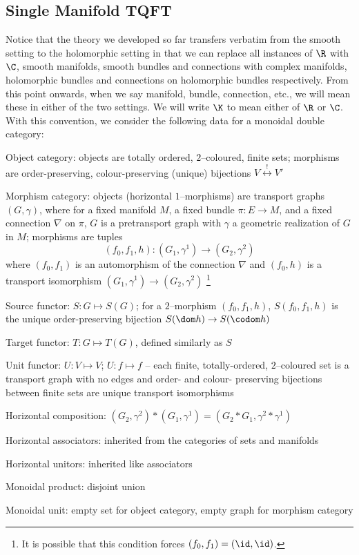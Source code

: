 
\subsection{Single Manifold TQFT}\label{subsec:sing_man_tqft}

Notice that the theory we developed so far transfers verbatim from the smooth
setting to the holomorphic setting in that we can replace all instances of $\R$
with $\C$, smooth manifolds, smooth bundles and connections with complex
manifolds, holomorphic bundles and connections on holomorphic bundles
respectively. From this point onwards, when we say manifold, bundle, connection,
etc., we will mean these in either of the two settings. We will write $\K$ to
mean either of $\R$ or $\C$. With this convention, we consider the following
data for a monoidal double category:

\begin{enmrt}
\li Object category: objects are totally ordered, $2$--coloured, finite sets;
morphisms are order-preserving, colour-preserving (unique) bijections
$V \stackrel{!}{\longleftrightarrow} V'$

\li Morphism category: objects (horizontal $1$--morphisms) are transport graphs
$(G, \gamma)$, where for a fixed manifold $M$, a fixed bundle $\pi : E \to M$,
and a fixed connection $\nabla$ on $\pi$, $G$ is a pretransport graph with
$\gamma$ a geometric realization of $G$ in $M$; morphisms are tuples
\[
  (f_0, f_1, h) : (G_1, \gamma^1) \to (G_2, \gamma^2)
\]
where $(f_0, f_1)$ is an automorphism of the connection $\nabla$ and
$(f_0, h)$ is a transport isomorphism $(G_1, \gamma^1) \to (G_2, \gamma^2)$
\footnote{It is possible that this condition forces $(f_0, f_1) = (\id, \id)$.}

\li Source functor: $S : G \mapsto S(G)$; for a $2$--morphism $(f_0, f_1, h)$,
$S(f_0, f_1, h)$ is the unique order-preserving bijection
$S(\dom h) \to S(\codom h)$

\li Target functor: $T : G \mapsto T(G)$, defined similarly as $S$

\li Unit functor: $U : V \mapsto V$; $U : f \mapsto f$ -- each finite,
totally-ordered, $2$--coloured set is a transport graph with no edges and
order- and colour- preserving bijections between finite sets are unique
transport isomorphisms

\li Horizontal composition:
$(G_2, \gamma^2) * (G_1, \gamma^1) = (G_2 * G_1, \gamma^2 * \gamma^1)$

\li Horizontal associators: inherited from the categories of sets and manifolds

\li Horizontal unitors: inherited like associators

\li Monoidal product: disjoint union

\li Monoidal unit: empty set for object category, empty graph for morphism
category
\end{enmrt}

